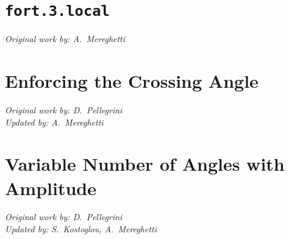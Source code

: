 \section{\texttt{fort.3.local}} \label{fort3local}
\begin{flushright}
\emph{Original work by: A.~Mereghetti}
\end{flushright}

\section{Enforcing the Crossing Angle} \label{EnforceXingAngle}
\begin{flushright}
\emph{Original work by: D.~Pellegrini} \\
\emph{Updated by: A.~Mereghetti}
\end{flushright}

\section{Variable Number of Angles with Amplitude} \label{varAnglesWithAmpli}
\begin{flushright}
\emph{Original work by: D.~Pellegrini} \\
\emph{Updated by: S.~Kostoglou, A.~Mereghetti}
\end{flushright}

